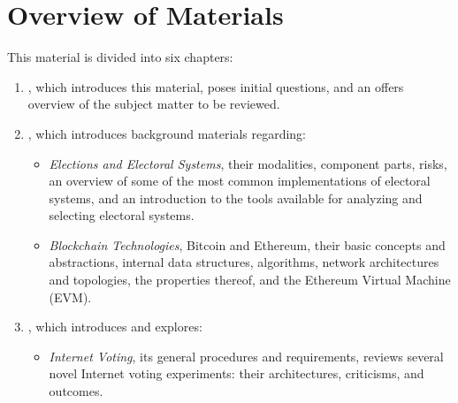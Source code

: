 \section{Overview of Materials}

%

This material is divided into six chapters:

\begin{enumerate}
  \item \emph{}, which introduces this material, poses
    initial questions, and an offers overview of the subject matter to be
    reviewed.

  \item \emph{}, which introduces background materials
    regarding:

    \begin{itemize}

      \item \emph{Elections and Electoral Systems}, their modalities, component
        parts, risks, an overview of some of the most common implementations
        of electoral systems, and an introduction to the tools available for
        analyzing and selecting electoral systems.

      \item \emph{Blockchain Technologies}, Bitcoin and Ethereum, their basic
        concepts and abstractions, internal data structures, algorithms,
        network architectures and topologies, the properties thereof, and
        the Ethereum Virtual Machine (EVM).
    \end{itemize}

  \item \emph{}, which introduces and explores:

    \begin{itemize}
      \item \emph{Internet Voting}, its general procedures and requirements,
        reviews several novel Internet voting experiments: their architectures,
        criticisms, and outcomes.


\end{itemize}
\end{enumerate}
